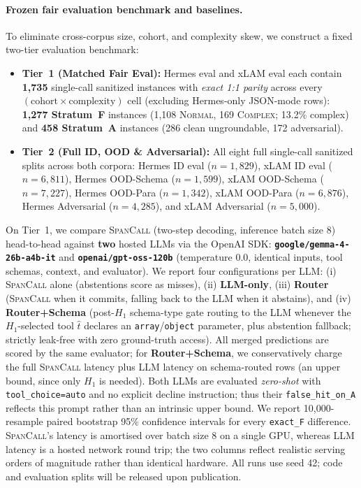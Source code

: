 \paragraph{Frozen fair evaluation benchmark and baselines.}
To eliminate cross-corpus size, cohort, and complexity skew, we construct a fixed two-tier evaluation benchmark:
\begin{itemize}
    \item \textbf{Tier~1 (Matched Fair Eval):} Hermes eval and xLAM eval each contain \textbf{1,735} single-call sanitized instances with \emph{exact 1:1 parity} across every $(\text{cohort} \times \text{complexity})$ cell (excluding Hermes-only JSON-mode rows): \textbf{1,277 Stratum~F} instances (1,108 \textsc{Normal}, 169 \textsc{Complex}; 13.2\% complex) and \textbf{458 Stratum~A} instances (286 clean ungroundable, 172 adversarial).
    \item \textbf{Tier~2 (Full ID, OOD \& Adversarial):} All eight full single-call sanitized splits across both corpora: Hermes ID eval ($n{=}1{,}829$), xLAM ID eval ($n{=}6{,}811$), Hermes OOD-Schema ($n{=}1{,}599$), xLAM OOD-Schema ($n{=}7{,}227$), Hermes OOD-Para ($n{=}1{,}342$), xLAM OOD-Para ($n{=}6{,}876$), Hermes Adversarial ($n{=}4{,}285$), and xLAM Adversarial ($n{=}5{,}000$).
\end{itemize}

On Tier~1, we compare \textsc{SpanCall} (two-step decoding, inference batch size 8) head-to-head against \textbf{two} hosted LLMs via the OpenAI SDK: \textbf{\texttt{google/gemma-4-26b-a4b-it}} and \textbf{\texttt{openai/gpt-oss-120b}} (temperature 0.0, identical inputs, tool schemas, context, and evaluator). We report four configurations per LLM: (i) \textsc{SpanCall} alone (abstentions score as misses), (ii) \textbf{LLM-only}, (iii) \textbf{Router} (\textsc{SpanCall} when it commits, falling back to the LLM when it abstains), and (iv) \textbf{Router+Schema} (post-$H_1$ schema-type gate routing to the LLM whenever the $H_1$-selected tool $\hat{t}$ declares an \texttt{array}/\texttt{object} parameter, plus abstention fallback; strictly leak-free with zero ground-truth access). All merged predictions are scored by the same evaluator; for \textbf{Router+Schema}, we conservatively charge the full \textsc{SpanCall} latency plus LLM latency on schema-routed rows (an upper bound, since only $H_1$ is needed). Both LLMs are evaluated \emph{zero-shot} with \texttt{tool\_choice=auto} and no explicit decline instruction; thus their \texttt{false\_hit\_on\_A} reflects this prompt rather than an intrinsic upper bound. We report 10,000-resample paired bootstrap 95\% confidence intervals for every \texttt{exact\_F} difference. \textsc{SpanCall}'s latency is amortised over batch size 8 on a single GPU, whereas LLM latency is a hosted network round trip; the two columns reflect realistic serving orders of magnitude rather than identical hardware. All runs use seed 42; code and evaluation splits will be released upon publication.